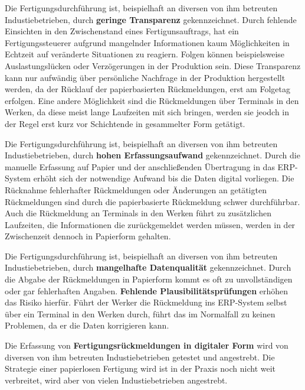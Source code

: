 \begin{definitionForm}[KA-P-2]
Die Fertigungsdurchführung ist, beispielhaft an diversen von ihm betreuten Industiebetrieben, durch \textbf{geringe Transparenz} gekennzeichnet. Durch fehlende Einsichten in den Zwischenstand eines Fertigunsauftrags, hat ein Fertigungssteuerer aufgrund mangelnder Informationen kaum Möglichkeiten in Echtzeit auf veränderte Situationen zu reagiern. Folgen können beispielsweise Auslastungslücken oder Verzögerungen in der Produktion sein. Diese Transparenz kann nur aufwändig über persönliche Nachfrage in der Produktion hergestellt werden, da der Rücklauf der papierbasierten Rückmeldungen, erst am Folgetag erfolgen. Eine andere Möglichkeit sind die Rückmeldungen über Terminals in den Werken, da diese meist lange Laufzeiten mit sich bringen, werden sie jeodch in der Regel erst kurz vor Schichtende in gesammelter Form getätigt. 
\end{definitionForm}

\begin{definitionForm}[KA-P-3]
Die Fertigungsdurchführung ist, beispielhaft an diversen von ihm betreuten Industiebetrieben, durch \textbf{hohen Erfassungsaufwand} gekennzeichnet. Durch die manuelle Erfassung auf Papier und der anschließenden Übertragung in das ERP-System erhöht sich der notwendige Aufwand bis die Daten digital vorliegen. Die Rücknahme fehlerhafter Rückmeldungen oder Änderungen an getätigten Rückmeldungen sind durch die papierbasierte Rückmeldung schwer durchführbar. Auch die Rückmeldung an Terminals in den Werken führt zu zusätzlichen Laufzeiten, die Informationen die zurückgemeldet werden müssen, werden in der Zwischenzeit dennoch in Papierform gehalten. 
\end{definitionForm}

\begin{definitionForm}[KA-P-4]
Die Fertigungsdurchführung ist, beispielhaft an diversen von ihm betreuten Industiebetrieben, durch \textbf{mangelhafte Datenqualität} gekennzeichnet. Durch die Abgabe der Rückmeldungen in Papierform kommt es oft zu unvollständigen oder gar fehlerhaften Angaben. \textbf{Fehlende Plausibilitätsprüfungen} erhöhen das Risiko hierfür. Führt der Werker die Rückmeldung ins ERP-System selbst über ein Terminal in den Werken durch, führt das im Normalfall zu keinen Problemen, da er die Daten korrigieren kann. 
\end{definitionForm}

\begin{definitionForm}[KA-P-5]
Die Erfassung von \textbf{Fertigungsrückmeldungen in digitaler Form} wird von diversen von ihm betreuten Industiebetrieben getestet und angestrebt. Die Strategie einer papierlosen Fertigung wird ist in der Praxis noch nicht weit verbreitet, wird aber von vielen Industiebetrieben angestrebt.
\end{definitionForm}


